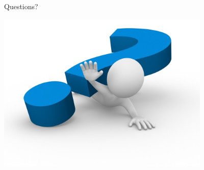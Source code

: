 \documentclass[8pt,xcolor=dvipnames]{beamer}
\begin{document}
\begin{frame}{Questions?}

\centering
\includegraphics[width=\linewidth,height=3in,keepaspectratio]{figures/question_mark.jpg}

\end{frame}
\end{document}

